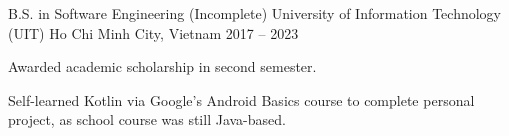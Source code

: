 \begin{cventries}
    \cventry
    {B.S. in Software Engineering (Incomplete)}
    {University of Information Technology (UIT)}
    {Ho Chi Minh City, Vietnam}
    {2017 -- 2023}
    {
        \begin{cvitems}
            \item {Awarded academic scholarship in second semester.}
            \item {Self-learned Kotlin via Google’s Android Basics course to complete personal project, as school course was still Java-based.}
        \end{cvitems}
    }
\end{cventries}
